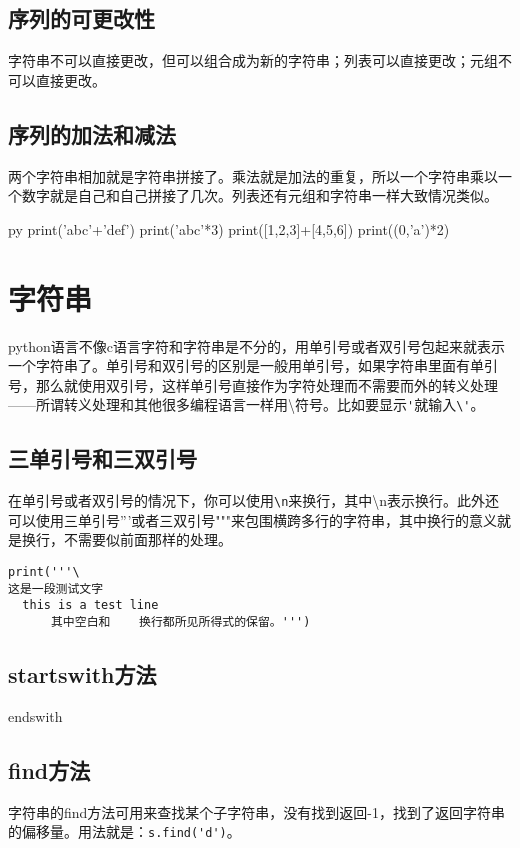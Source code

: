 \documentclass[12pt,oneside]{book}
\begin{document}
\begin{common-format}
\subsection{序列的可更改性}
字符串不可以直接更改，但可以组合成为新的字符串；列表可以直接更改；元组不可以直接更改。


\subsection{序列的加法和减法}
两个字符串相加就是字符串拼接了。乘法就是加法的重复，所以一个字符串乘以一个数字就是自己和自己拼接了几次。列表还有元组和字符串一样大致情况类似。

\begin{xverbatim}[129]{py}
print('abc'+'def')
print('abc'*3)
print([1,2,3]+[4,5,6])
print((0,'a')*2)
\end{xverbatim}


\section{字符串}
python语言不像c语言字符和字符串是不分的，用单引号或者双引号包起来就表示一个字符串了。单引号和双引号的区别是一般用单引号，如果字符串里面有单引号，那么就使用双引号，这样单引号直接作为字符处理而不需要而外的转义处理——所谓转义处理和其他很多编程语言一样用\textbackslash 符号。比如要显示\verb+'+就输入\verb+\'+。

\subsection{三单引号和三双引号}
在单引号或者双引号的情况下，你可以使用\verb+\n+来换行，其中\textbackslash n表示换行。此外还可以使用三单引号'''或者三双引号"""来包围横跨多行的字符串，其中换行的意义就是换行，不需要似前面那样的处理。

\begin{Verbatim}
print('''\
这是一段测试文字
  this is a test line
      其中空白和    换行都所见所得式的保留。''')
\end{Verbatim}


\subsection{startswith方法}

endswith


\subsection{find方法}
字符串的find方法可用来查找某个子字符串，没有找到返回-1，找到了返回字符串的偏移量。用法就是：\verb+s.find('d')+。



\end{common-format}
\end{document}
